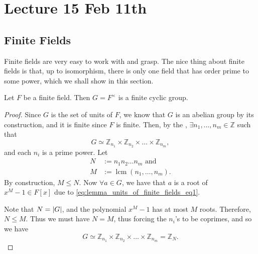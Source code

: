 \documentclass[notoc,notitlepage,nobib]{tufte-book}
\DeclareMathOperator{\lcm}{lcm}
\begin{document}

\chapter{Lecture 15 Feb 11th}%
\label{chp:lecture_15_feb_11th}

\section{Finite Fields}%
\label{sec:finite_fields}

Finite fields are very easy to work with and grasp. The nice thing about finite fields is
that, up to isomorphism, there is only one field that has order prime to some power, which
we shall show in this section.

\begin{lemma}\label{lemma:units_of_a_finite_field_form_a_finite_cyclic_group}
  Let $F$ be a finite field. Then $G = F^\times$ is a finite cyclic group.
\end{lemma}

\begin{proof}
  Since $G$ is the set of units of $F$, we know that $G$ is an abelian group by its
  construction, and it is finite since $F$ is finite. Then, by the , $\exists n_1, \ldots, n_m \in \mathbb{Z}$ such that
  \begin{equation}\label{eq:lemma_units_of_finite_fields_eq1}
    G \simeq \mathbb{Z}_{n_1} \times \mathbb{Z}_{n_2} \times \hdots \times
    \mathbb{Z}_{n_m},
  \end{equation}
  and each $n_i$ is a prime power. Let
  \begin{align*}
    N &:= n_1 n_2 \hdots n_m \text{ and } \\
    M &:= \lcm(n_1, \ldots, n_m).
  \end{align*}
  By construction, $M \leq N$. Now $\forall a \in G$, we have that $a$ is a root of $x^M -
  1 \in F[x]$ due to \cref{eq:lemma_units_of_finite_fields_eq1}.
  
  Note that $N = \left|G\right|$, and the polynomial $x^M - 1$ has at most $M$ roots. Therefore,
  $N \leq M$. Thus we must have $N = M$, thus forcing the $n_i$'s to be coprimes, and so
  we have
  \begin{equation*}
    G \simeq \mathbb{Z}_{n_1} \times \mathbb{Z}_{n_2} \times \hdots \times
    \mathbb{Z}_{n_m} = \mathbb{Z}_N.
  \end{equation*}
\end{proof}
\end{document}
